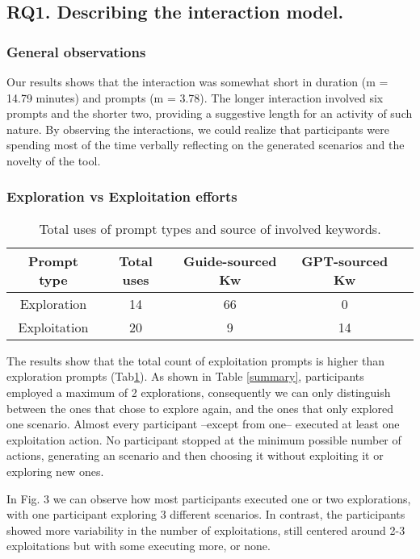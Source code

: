 \documentclass[sn-mathphys, Numbered]{sn-jnl}%
\theoremstyle{thmstyleone}%
\theoremstyle{thmstyletwo}%
\theoremstyle{thmstylethree}%
\begin{document}
\subsection{RQ1. Describing the interaction model.}

\subsubsection{General observations}
Our results shows that the interaction was somewhat short in duration (m = 14.79 minutes) and prompts (m = 3.78).  The longer interaction involved six prompts and the shorter two, providing a suggestive length for an activity of such nature. By observing the interactions, we could realize that participants were spending most of the time verbally reflecting on the generated scenarios and the novelty of the tool.  



\subsubsection*{Exploration vs Exploitation efforts}


\begin{table}  \caption{Total uses of prompt types and source of involved keywords.}
    \centering
    \begin{tabular}{c|cccc}   
         Prompt type&  Total uses&  Guide-sourced Kw&  GPT-sourced Kw& \\ \hline  
         Exploration&  14&  66&  0& \\   
         Exploitation&  20&  9&  14& \\ 
    \end{tabular}
    \label{tab:Xi vs Xr}
\end{table}


The results show that the total count of exploitation prompts is higher than exploration prompts (Tab\ref{tab:Xi vs Xr}). As shown in Table \ref{summary}, participants employed a maximum of 2 explorations, consequently we can only distinguish between the ones that chose to explore again, and the ones that only explored one scenario. Almost every participant –except from one– executed at least one exploitation action.
No participant stopped at the minimum possible number of actions, generating an scenario and then choosing it without exploiting it or exploring new ones. 

In Fig. 3 we can observe how most participants executed one or two explorations, with one participant exploring 3 different scenarios. In contrast, the participants showed more variability in the number of exploitations, still centered around 2-3 exploitations but with some executing more, or none.
\end{document}

